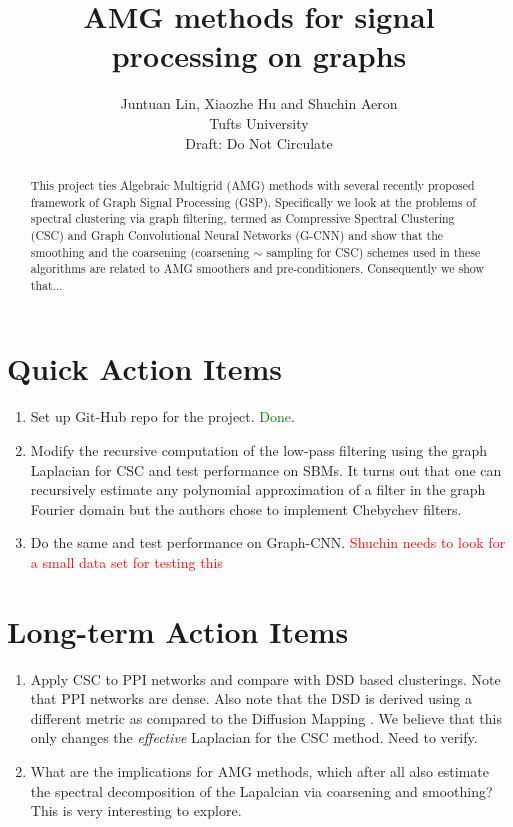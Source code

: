 \documentclass{article}
\title{AMG methods for signal processing on graphs}
\author{ Juntuan Lin, Xiaozhe Hu and Shuchin Aeron\\
Tufts University\\
Draft: Do Not Circulate}
\begin{document}

\maketitle

\begin{abstract}
  This project ties Algebraic Multigrid (AMG) methods with several recently proposed framework of Graph Signal Processing (GSP). Specifically we look at the problems of spectral clustering via graph filtering, termed as Compressive Spectral Clustering (CSC) and Graph Convolutional Neural Networks (G-CNN) and show that the smoothing and the coarsening (coarsening $\sim$ sampling for CSC) schemes used in these algorithms are related to AMG smoothers and pre-conditioners. Consequently we show that...  \end{abstract}

\section{Quick Action Items}

\begin{enumerate}
\item Set up Git-Hub repo for the project. \textcolor{green}{Done}.
	\item Modify the recursive computation of the low-pass filtering using the graph Laplacian for CSC and test performance on SBMs. It turns out that one can recursively estimate any polynomial approximation of a filter in the graph Fourier domain but the authors chose to implement Chebychev filters. 
	\item Do the same and test performance on Graph-CNN. \textcolor{red}{Shuchin needs to look for a small data set for testing this}
\end{enumerate}

\section{Long-term Action Items}
\begin{enumerate}
	\item Apply CSC to PPI networks and compare with DSD based clusterings. Note that PPI networks are dense. Also note that the DSD is derived using a different metric as compared to the Diffusion Mapping \cite{xx}. We believe that this only changes the \emph{effective} Laplacian for the CSC method. Need to verify. 
	\item What are the implications for AMG methods, which after all also estimate the spectral decomposition of the Lapalcian via coarsening and smoothing? This is very interesting to explore. 
\end{enumerate}
\end{document}
